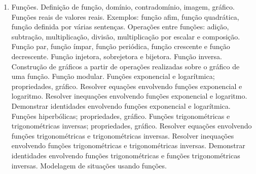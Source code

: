 \begin{enumerate}
 \item Funções. Definição de função, domínio, contradomínio, imagem, gráfico. Funções reais de valores reais. Exemplos: função afim, função quadrática, função definida por várias sentenças. Operações entre funções: adição, subtração, multiplicação, divisão, multiplicação por escalar e composição. Função par, função ímpar, função periódica, função crescente e função decrescente. Função injetora, sobrejetora e bijetora. Função inversa. Construção de gráficos a partir de operações realizadas sobre o gráfico de uma função. Função modular. Funções exponencial e logarítmica; propriedades, gráfico. Resolver equações envolvendo funções exponencial e logaritmo. Resolver inequações envolvendo funções exponencial e logaritmo. Demonstrar identidades envolvendo funções exponencial e logarítmica. Funções hiperbólicas; propriedades, gráfico. Funções trigonométricas e trigonométricas inversas; propriedades, gráfico. Resolver equações envolvendo funções trigonométricas e trigonométricas inversas. Resolver inequações envolvendo funções trigonométricas e trigonométricas inversas. Demonstrar identidades envolvendo funções trigonométricas e funções trigonométricas inversas. Modelagem de situações usando funções. 

\end{enumerate}
